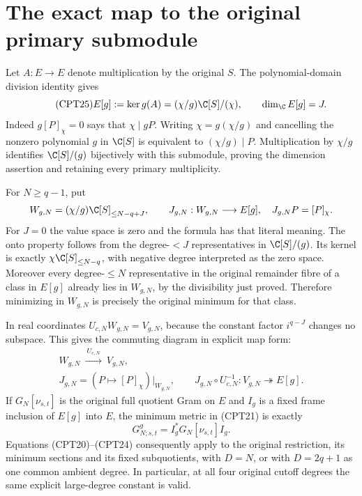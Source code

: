 \section{The exact map to the original primary submodule}

Let \(A:E\to E\) denote multiplication by the original \(S\).
The polynomial-domain division identity gives
\begin{equation}\tag{CPT25}
 E[g]:=\ker g(A)=(\chi/g)\C[S]/(\chi),\qquad
 \dim_\C E[g]=J.
\end{equation}
Indeed \(g[P]_\chi=0\) says that \(\chi\mid gP\).
Writing \(\chi=g(\chi/g)\) and cancelling the nonzero polynomial
\(g\) in \(\C[S]\) is equivalent to \((\chi/g)\mid P\).
Multiplication by \(\chi/g\) identifies
\(\C[S]/(g)\) bijectively with this submodule, proving the
dimension assertion and retaining every primary multiplicity.

For \(N\ge q-1\), put
\[
 W_{g,N}=(\chi/g)\C[S]_{\le N-q+J},\qquad
 J_{g,N}:W_{g,N}\longrightarrow E[g],\quad
 J_{g,N}P=[P]_\chi.
\]
For \(J=0\) the value space is zero and the formula has that
literal meaning.  The onto property follows from the
degree-\(<J\) representatives in \(\C[S]/(g)\).
Its kernel is exactly \(\chi\C[S]_{\le N-q}\), with negative
degree interpreted as the zero space.  Moreover every
degree-\(\le N\) representative in the original remainder fibre
of a class in \(E[g]\) already lies in \(W_{g,N}\), by the
divisibility just proved.  Therefore minimizing in \(W_{g,N}\)
is precisely the original minimum for that class.

In real coordinates \(U_{c,N}W_{g,N}=V_{g,N}\), because the
constant factor \(i^{q-J}\) changes no subspace.  This gives the
commuting diagram in explicit map form:
\begin{equation}\tag{CPT26}
\begin{gathered}
 W_{g,N}\ \xrightarrow{\ U_{c,N}\ }\ V_{g,N},\\
 J_{g,N}
 =\left(P\longmapsto[P]_\chi\right)\big|_{W_{g,N}},
 \qquad
 J_{g,N}\circ U_{c,N}^{-1}:V_{g,N}\twoheadrightarrow E[g].
\end{gathered}
\end{equation}
If \(G_N[\nu_{s,t}]\) is the original full quotient Gram on \(E\)
and \(I_g\) is a fixed frame inclusion of \(E[g]\) into \(E\),
the minimum metric in (CPT21) is exactly
\begin{equation}\tag{CPT27}
 G^{g}_{N;s,t}=I_g^*G_N[\nu_{s,t}]I_g.
\end{equation}
Equations (CPT20)--(CPT24) consequently apply to the original
restriction, its minimum sections and its fixed subquotients,
with \(D=N\), or with \(D=2q+1\) as one common ambient degree.
In particular, at all four original cutoff degrees the same
explicit large-degree constant is valid.

